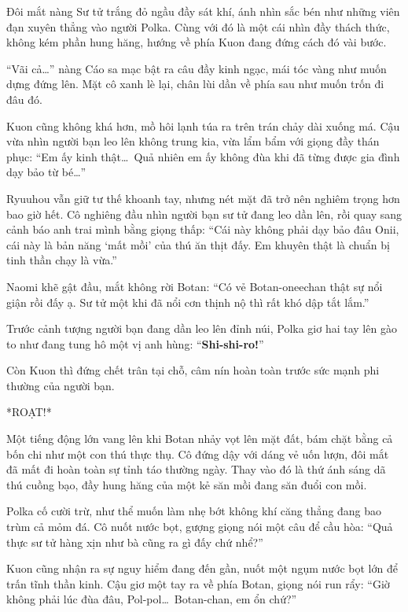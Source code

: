 \documentclass[../main.tex]{subfiles}
\begin{document}
Đôi mắt nàng Sư tử trắng đỏ ngầu đầy sát khí, ánh nhìn sắc bén như những viên đạn xuyên thẳng vào người Polka. Cùng với đó là một cái nhìn đầy thách thức, không kém phần hung hăng, hướng về phía Kuon đang đứng cách đó vài bước.


``Vãi cả\dots'' nàng Cáo sa mạc bật ra câu đầy kinh ngạc, mái tóc vàng như muốn dựng đứng lên. Mặt cô xanh lè lại, chân lùi dần về phía sau như muốn trốn đi đâu đó.

Kuon cũng không khá hơn, mồ hôi lạnh túa ra trên trán chảy dài xuống má. Cậu vừa nhìn người bạn leo lên không trung kia, vừa lẩm bẩm với giọng đầy thán phục: ``Em ấy kinh thật\dots\ Quả nhiên em ấy không đùa khi đã từng được gia đình dạy bảo từ bé\dots''

Ryuuhou vẫn giữ tư thế khoanh tay, nhưng nét mặt đã trở nên nghiêm trọng hơn bao giờ hết. Cô nghiêng đầu nhìn người bạn sư tử đang leo dần lên, rồi quay sang cảnh báo anh trai mình bằng giọng thấp: ``Cái này không phải dạy bảo đâu Onii, cái này là bản năng `mất mồi' của thú ăn thịt đấy. Em khuyên thật là chuẩn bị tinh thần chạy là vừa.''

Naomi khẽ gật đầu, mắt không rời Botan: ``Có vẻ Botan-oneechan thật sự nổi giận rồi đấy ạ. Sư tử một khi đã nổi cơn thịnh nộ thì rất khó dập tắt lắm.''

Trước cảnh tượng người bạn đang dần leo lên đỉnh núi, Polka giơ hai tay lên gào to như đang tung hô một vị anh hùng: ``\textbf{Shi-shi-ro!}''

Còn Kuon thì đứng chết trân tại chỗ, câm nín hoàn toàn trước sức mạnh phi thường của người bạn.

*ROẠT!*

Một tiếng động lớn vang lên khi Botan nhảy vọt lên mặt đất, bám chặt bằng cả bốn chi như một con thú thực thụ. Cô đứng dậy với dáng vẻ uốn lượn, đôi mắt đã mất đi hoàn toàn sự tỉnh táo thường ngày. Thay vào đó là thứ ánh sáng dã thú cuồng bạo, đầy hung hăng của một kẻ săn mồi đang săn đuổi con mồi.

Polka cố cười trừ, như thể muốn làm nhẹ bớt không khí căng thẳng đang bao trùm cả mỏm đá. Cô nuốt nước bọt, gượng giọng nói một câu để cầu hòa: ``Quả thực sư tử hàng xịn như bà cũng ra gì đấy chứ nhể?''

Kuon cũng nhận ra sự nguy hiểm đang đến gần, nuốt một ngụm nước bọt lớn để trấn tĩnh thần kinh. Cậu giơ một tay ra về phía Botan, giọng nói run rẩy: ``Giờ không phải lúc đùa đâu, Pol-pol\dots\ Botan-chan, em ổn chứ?''
\end{document}
